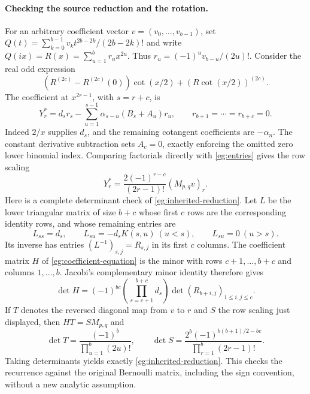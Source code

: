 \documentclass[11pt]{article}
\theoremstyle{definition}
\theoremstyle{remark}
\numberwithin{equation}{section}
\begin{document}
\paragraph{Checking the source reduction and the rotation.}
For an arbitrary coefficient vector $v=(v_0,\ldots,v_{b-1})$, set
$Q(t)=\sum_{k=0}^{b-1}v_k t^{2b-2k}/(2b-2k)!$ and write
$Q(ix)=R(x)=\sum_{u=1}^b r_ux^{2u}$. Thus
$r_u=(-1)^uv_{b-u}/(2u)!$. Consider the real odd expression
\[
 (R^{(2c)}-R^{(2c)}(0))\cot(x/2)+(R\cot(x/2))^{(2c)}.
\]
The coefficient at $x^{2r-1}$, with $s=r+c$, is
\begin{equation}\label{eg:coefficient-equation}
 Y_r^*=d_sr_s-\sum_{u=1}^{s-1}\alpha_{s-u}(B_s+A_u)r_u,
 \qquad r_{b+1}=\cdots=r_{b+c}=0.
\end{equation}
Indeed $2/x$ supplies $d_s$, and the remaining cotangent coefficients
are $-\alpha_n$. The constant derivative subtraction sets $A_c=0$,
exactly enforcing the omitted zero lower binomial index.
Comparing factorials directly with \eqref{eg:entries} gives the row scaling
\[
 Y_r^*=\frac{2(-1)^{r-c}}{(2r-1)!}(M_{p,q}v)_r.
\]
Here is a complete determinant check of
\eqref{eg:inherited-reduction}. Let $L$ be the lower triangular
matrix of size $b+c$ whose first $c$ rows are the corresponding
identity rows, and whose remaining entries are
\[
 L_{ss}=d_s,\qquad L_{su}=-d_sK(s,u)\ (u<s),\qquad
 L_{su}=0\ (u>s).
\]
Its inverse has entries $(L^{-1})_{s,j}=R_{s,j}$ in its first $c$
columns. The coefficient matrix $H$ of
\eqref{eg:coefficient-equation} is the minor with rows
$c+1,\ldots,b+c$ and columns $1,\ldots,b$. Jacobi's complementary
minor identity therefore gives
\[
 \det H=(-1)^{bc}\left(\prod_{s=c+1}^{b+c}d_s\right)
                     \det(R_{b+i,j})_{1\le i,j\le c}.
\]
If $T$ denotes the reversed diagonal map from $v$ to $r$ and $S$
the row scaling just displayed, then $HT=SM_{p,q}$ and
\[
 \det T=\frac{(-1)^b}{\prod_{u=1}^b(2u)!},\qquad
 \det S=\frac{2^b(-1)^{b(b+1)/2-bc}}
                       {\prod_{r=1}^b(2r-1)!}.
\]
Taking determinants yields exactly
\eqref{eg:inherited-reduction}. This checks the recurrence against
the original Bernoulli matrix, including the sign convention, without
a new analytic assumption.
\end{document}
